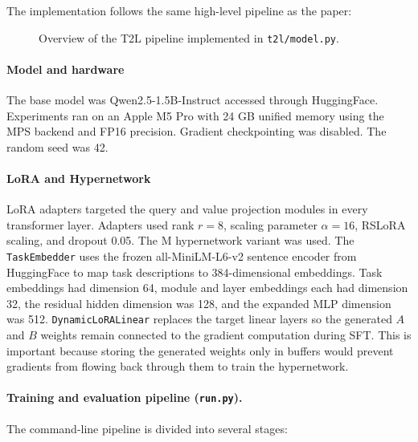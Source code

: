 \documentclass{article}
\begin{document}
The implementation follows the same high-level pipeline as the paper:

\begin{figure}[t]
\centering
{}
\caption{Overview of the T2L pipeline implemented in \texttt{t2l/model.py}.}
\label{fig:sketch}
\end{figure}

\paragraph{Model and hardware}
The base model was Qwen2.5-1.5B-Instruct accessed through HuggingFace. Experiments ran on an Apple M5 Pro with 24 GB unified memory using the MPS backend and FP16 precision. Gradient checkpointing was disabled. The random seed was 42.

\paragraph{LoRA and Hypernetwork}
LoRA adapters targeted the query and value projection modules in every transformer layer. Adapters used rank $r=8$, scaling parameter $\alpha=16$, RSLoRA scaling, and dropout 0.05. The M hypernetwork
variant was used. The \texttt{TaskEmbedder} uses the frozen all-MiniLM-L6-v2 sentence encoder from HuggingFace to map task descriptions to 384-dimensional embeddings. Task embeddings had dimension 64, module and layer embeddings each had dimension 32, the residual hidden dimension was 128, and the expanded MLP dimension was 512. \texttt{DynamicLoRALinear} replaces the target linear layers so the generated $A$ and $B$ weights remain connected to the gradient computation during SFT. This is important because storing the generated weights only in buffers would prevent gradients from flowing back through them to train the hypernetwork.

\paragraph{Training and evaluation pipeline (\texttt{run.py}).}
The command-line pipeline is divided into several stages:
\end{document}
